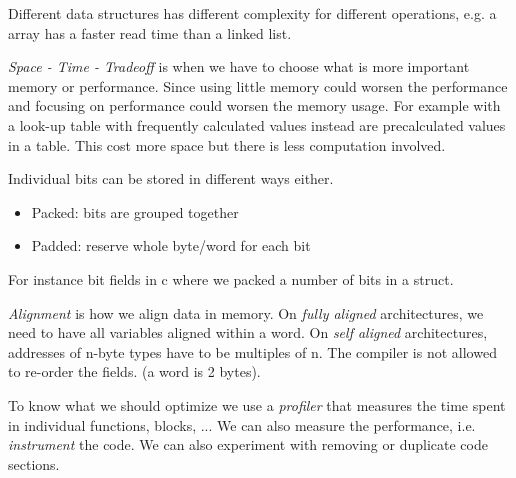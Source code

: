 Different data structures has different complexity for different operations,
e.g. a array has a faster read time than a linked list.

\textit{Space - Time - Tradeoff} is when we have to choose what is more important
memory or performance. Since using little memory could worsen the performance and
focusing on performance could worsen the memory usage.
For example with a look-up table with frequently calculated values instead are precalculated 
values in a table. This cost more space but there is less computation involved.

Individual bits can be stored in different ways either.
\begin{itemize}
    \item Packed: bits are grouped together
    \item Padded: reserve whole byte/word for each bit
\end{itemize}

For instance bit fields in c where we packed a number of bits in a struct.

\textit{Alignment} is how we align data in memory. 
On \textit{fully aligned} architectures, we need to have all variables aligned within a word.
On \textit{self aligned} architectures, addresses of n-byte types have to be multiples of n.
The compiler is not allowed to re-order the fields. (a word is 2 bytes).

To know what we should optimize we use a \textit{profiler} that measures the time
spent in individual functions, blocks, ...
We can also measure the performance, i.e. \textit{instrument} the code.
We can also experiment with removing or duplicate code sections.

